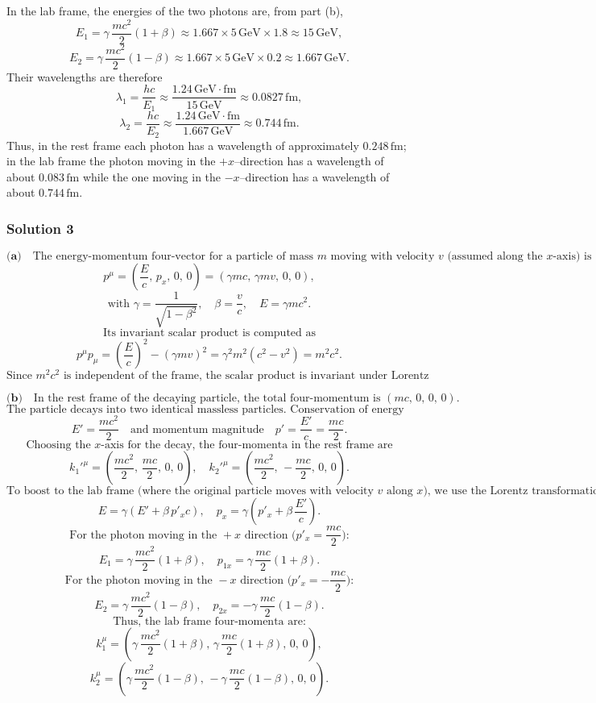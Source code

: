 \documentclass{article}
\begin{document}
In the lab frame, the energies of the two photons are, from part (b),
\[
E_1 = \gamma\,\frac{m c^2}{2}(1+\beta) \approx 1.667 \times 5\,\text{GeV} \times 1.8 \approx 15\,\text{GeV},
\]
\[
E_2 = \gamma\,\frac{m c^2}{2}(1-\beta) \approx 1.667 \times 5\,\text{GeV} \times 0.2 \approx 1.667\,\text{GeV}.
\]
Their wavelengths are therefore
\[
\lambda_1 = \frac{hc}{E_1} \approx \frac{1.24\,\text{GeV}\cdot\text{fm}}{15\,\text{GeV}} \approx 0.0827\,\text{fm},
\]
\[
\lambda_2 = \frac{hc}{E_2} \approx \frac{1.24\,\text{GeV}\cdot\text{fm}}{1.667\,\text{GeV}} \approx 0.744\,\text{fm}.
\]
Thus, in the rest frame each photon has a wavelength of approximately \(0.248\,\text{fm}\); in the lab frame the photon moving in the \(+x\)–direction has a wavelength of about \(0.083\,\text{fm}\) while the one moving in the \(-x\)–direction has a wavelength of about \(0.744\,\text{fm}\).


\subsubsection{Solution 3}
\[
\textbf{(a)}\quad \text{The energy-momentum four-vector for a particle of mass } m \text{ moving with velocity } v \text{ (assumed along the } x\text{-axis) is}
\]
\[
p^\mu = \left(\frac{E}{c},\, p_x,\, 0,\, 0\right) = \left(\gamma m c,\, \gamma m v,\, 0,\, 0\right),
\]
\[
\text{with } \gamma = \frac{1}{\sqrt{1-\beta^2}},\quad \beta=\frac{v}{c},\quad E=\gamma m c^2.
\]
\[
\text{Its invariant scalar product is computed as}
\]
\[
p^\mu p_\mu = \left(\frac{E}{c}\right)^2 - (\gamma m v)^2 = \gamma^2 m^2 \left(c^2 - v^2\right) = m^2 c^2.
\]
\[
\text{Since } m^2 c^2 \text{ is independent of the frame, the scalar product is invariant under Lorentz transformations.}
\]

\[
\textbf{(b)}\quad \text{In the rest frame of the decaying particle, the total four-momentum is } (mc,\,0,\,0,\,0).
\]
\[
\text{The particle decays into two identical massless particles. Conservation of energy and momentum in the rest frame requires each particle to have energy}
\]
\[
E'=\frac{m c^2}{2}\quad \text{and momentum magnitude} \quad p'=\frac{E'}{c}=\frac{m c}{2}.
\]
\[
\text{Choosing the } x\text{-axis for the decay, the four-momenta in the rest frame are}
\]
\[
k_1'^\mu = \left(\frac{m c^2}{2},\, \frac{m c}{2},\, 0,\, 0\right),\quad k_2'^\mu = \left(\frac{m c^2}{2},\, -\frac{m c}{2},\, 0,\, 0\right).
\]
\[
\text{To boost to the lab frame (where the original particle moves with velocity } v \text{ along } x\text{), we use the Lorentz transformation:}
\]
\[
E = \gamma \left(E' + \beta\, p'_x c\right),\quad p_x = \gamma \left(p'_x + \beta\,\frac{E'}{c}\right).
\]
\[
\text{For the photon moving in the } +x \text{ direction (} p'_x=\frac{m c}{2} \text{):}
\]
\[
E_1 = \gamma\,\frac{m c^2}{2}(1+\beta),\quad p_{1x} = \gamma\,\frac{m c}{2}(1+\beta).
\]
\[
\text{For the photon moving in the } -x \text{ direction (} p'_x=-\frac{m c}{2} \text{):}
\]
\[
E_2 = \gamma\,\frac{m c^2}{2}(1-\beta),\quad p_{2x} = -\gamma\,\frac{m c}{2}(1-\beta).
\]
\[
\text{Thus, the lab frame four-momenta are:}
\]
\[
k_1^\mu = \left(\gamma\,\frac{m c^2}{2}(1+\beta),\, \gamma\,\frac{m c}{2}(1+\beta),\, 0,\, 0\right),
\]
\[
k_2^\mu = \left(\gamma\,\frac{m c^2}{2}(1-\beta),\, -\gamma\,\frac{m c}{2}(1-\beta),\, 0,\, 0\right).
\]
\end{document}
